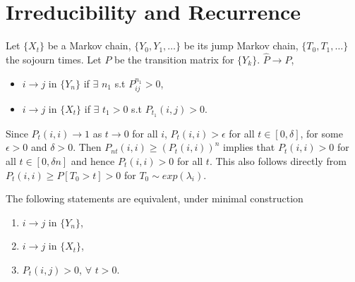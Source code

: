 \documentclass[all-lectures.tex]{subfiles}
\begin{document}

\setcounter{section}{3}
\setcounter{subsection}{0}

\section*{}
\chr
\section{Irreducibility and Recurrence}
Let $\{X_t\}$ be a Markov chain, $\{Y_0, Y_1, \dots\}$ be its jump Markov chain, $\{T_0, T_1, \dots\}$ the sojourn times. Let $P$ be the transition matrix for $\{Y_k\}$.
$\hat{P} \to P$,
\begin{itemize}
\item $i \to j$ in $\{Y_n\}$ if $\exists$ $n_1$ s.t $P^{n_1}_{ij} > 0$,
\item $i \to j$ in $\{X_t\}$ if $\exists$ $t_1 >0$ s.t $P_{t_1}(i,j) > 0$.
\end{itemize}

Since $P_t(i,i)\to 1$ as $t \to 0$ for all $i$, $P_t(i,i)  > \epsilon$ for all $t  \in [0, \delta]$, for some $\epsilon > 0$ and $\delta > 0$.
Then $P_{nt}(i,i) \ge (P_{t}(i,i))^n$ implies that $P_t(i,i)  >0$ for all $t \in [0, \delta n]$ and hence $P_t(i,i) > 0$ for all $t$.
This also follows directly from $P_t(i,i)  \geq P[T_0 >t] > 0$ for $T_0 \sim exp(\lambda_{i})$.
\begin{prop}
The following statements are equivalent, under minimal construction
\begin{enumerate}
\item $i \to j$ in $\{Y_n\}$,
\item $i \to j$ in $\{X_t\}$,
\item $P_t(i,j)  > 0 $, $\forall$ $ t>0$.
\end{enumerate}
\end{prop}
\end{document}

